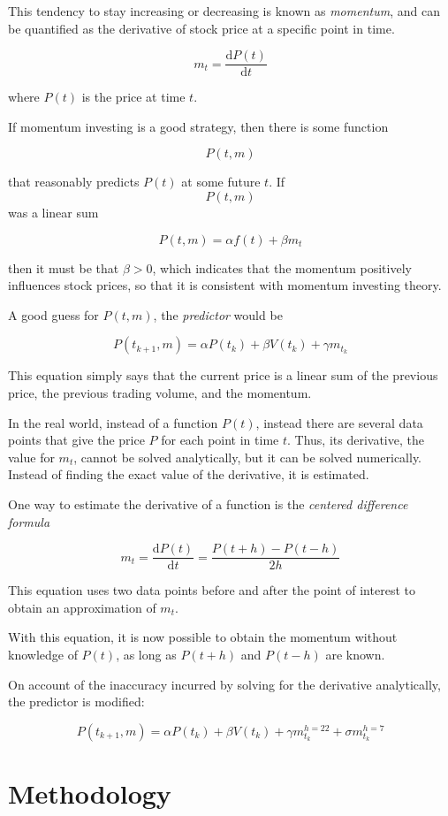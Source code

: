 \documentclass[8pt]{article}
\newcommand*{\deriv}{\ensuremath{\mathrm{d}}}
\begin{document}
	This tendency to stay increasing or decreasing is known as \textit{momentum}, and can be quantified as the derivative of stock price at a specific point in time.

	$$ m_{t} = \frac{\deriv P(t)}{\deriv t} $$

	where $P(t)$ is the price at time $t$.

	If momentum investing is a good strategy, then there is some function

	$$ P(t, m) $$

	that reasonably predicts $P(t)$ at some future $t$. If $$P(t,m)$$ was a 
	linear sum 

	$$ P(t,m) = \alpha f(t) + \beta m_{t} $$

	then it must be that $\beta > 0$, which indicates that the momentum 
	positively influences stock prices, so that it is consistent with 
	momentum investing theory.

	A good guess for $P(t,m)$, the \textit{predictor} would be 

	$$ P(t_{k+1},m) = \alpha P(t_{k}) + \beta V(t_{k}) + \gamma m_{t_k}$$

	This equation simply says that the current price is a linear sum of the previous price, the previous trading volume, and the momentum.

	In the real world, instead of a function $P(t)$, instead there are several data points that give the price $P$ for each point in time $t$.
	Thus, its derivative, the value for $m_{t}$, cannot be solved analytically, but it can be solved numerically.
	Instead of finding the exact value of the derivative, it is estimated.

	One way to estimate the derivative of a function is the \textit{centered difference formula}

	$$ m_{t} = \frac{\deriv P(t)}{\deriv t} = \frac{P(t+h) - P(t-h)}{2h} $$

	This equation uses two data points before and after the point of interest to obtain an approximation of $m_{t}$.

	With this equation, it is now possible to obtain the momentum without knowledge of $P(t)$, as long as $P(t+h)$ and $P(t-h)$ are known.

	On account of the inaccuracy incurred by solving for the derivative analytically, the predictor is modified:

	$$ P(t_{k+1},m) = \alpha P(t_{k}) + \beta V(t_{k}) +
	\gamma m^{h=22}_{t_k} + \sigma m^{h=7}_{t_k}$$

	\section{Methodology}
\end{document}
